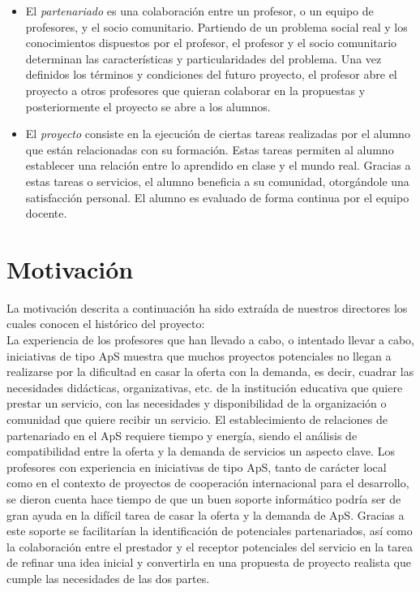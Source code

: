 \documentclass[11pt]{book}
\begin{document}
\begin{itemize}
	\item El \emph{partenariado} es una colaboración entre un profesor, o un equipo de profesores, y el socio comunitario. Partiendo de un problema social real y los conocimientos dispuestos por el profesor, el profesor y el socio comunitario determinan las características y particularidades del problema. Una vez definidos los términos y condiciones del futuro proyecto, el profesor abre el proyecto a otros profesores que quieran colaborar en la propuestas y posteriormente el proyecto se abre a los alumnos.
	\item El \emph{proyecto} consiste en la ejecución de ciertas tareas realizadas por el alumno que están relacionadas con su formación. Estas tareas permiten al alumno establecer una relación entre lo aprendido en clase y el mundo real. Gracias a estas tareas o servicios, el alumno beneficia a su comunidad, otorgándole una satisfacción personal. El alumno es evaluado de forma continua por el equipo docente.
\end{itemize}
\section{Motivación}\label{cap:cont-motidvacion}
La motivación descrita a continuación ha sido extraída de nuestros directores los cuales conocen el histórico del proyecto:\\
La experiencia de los profesores que han llevado a cabo, o intentado
llevar a cabo, iniciativas de tipo ApS muestra
que muchos proyectos potenciales no llegan a realizarse por la
dificultad en casar la oferta con la demanda, es decir, cuadrar las
necesidades didácticas, organizativas, etc. de la institución educativa
que quiere prestar un servicio, con las necesidades y disponibilidad de
la organización o comunidad que quiere recibir un servicio. El
establecimiento de relaciones de partenariado en el ApS requiere tiempo
y energía, siendo el análisis de compatibilidad entre la oferta y la
demanda de servicios un aspecto clave. Los profesores con experiencia en
iniciativas de tipo ApS, tanto de carácter local como en el contexto de
proyectos de cooperación internacional para el desarrollo, se dieron
cuenta hace tiempo de que un buen soporte informático podría ser de gran
ayuda en la difícil tarea de casar la oferta y la demanda de ApS.
Gracias a este soporte se facilitarían la identificación de potenciales
partenariados, así como la colaboración entre el prestador y el receptor
potenciales del servicio en la tarea de refinar una idea inicial y
convertirla en una propuesta de proyecto realista que cumple las
necesidades de las dos partes.\\\\
\end{document}

